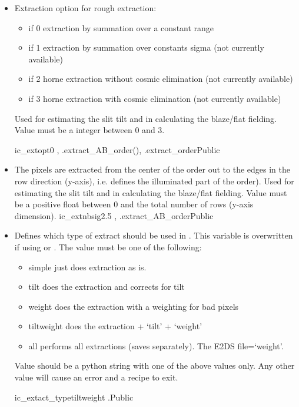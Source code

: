 \begin{itemize}

\item {}
{Extraction option for rough extraction:
\begin{itemize}
\item if 0 extraction by summation over a constant range
\item if 1 extraction by summation over constants sigma (not currently available)
\item if 2 horne extraction without cosmic elimination (not currently available)
\item if 3 horne extraction with cosmic elimination (not currently available)
\end{itemize}
 Used for estimating the slit tilt and in calculating the blaze/flat fielding. Value must be a integer between 0 and 3.
}
{ic\_extopt}{0}
{\calSLIT, \calFFraw}{\constantsfile}
{\spirouEXTOR.extract\_AB\_order(), \spirouEXTOR.extract\_order}{Public}

\item {}
{The pixels are extracted from the center of the order out to the edges in the row direction (y-axis), i.e. defines the illuminated part of the order). Used for estimating the slit tilt and in calculating the blaze/flat fielding. Value must be a positive float between 0 and the total number of rows (y-axis dimension).}
{ic\_extnbsig}{2.5}
{\calSLIT, \calFFraw}{\constantsfile}{\spirouEXTOR.extract\_AB\_order}{Public}


\item {}
{Defines which type of extract should be used in \calextractRAW. This variable is overwritten if using \calextractRAWAB or \calextractRAWC. The value must be one of the following:
\begin{itemize}
\item simple \dotfill just does extraction as is.
\item tilt \dotfill does the extraction and corrects for tilt
\item weight \dotfill does the extraction with a weighting for bad pixels
\item tiltweight \dotfill does the extraction + `tilt' + `weight'
\item all \dotfill performs all extractions (saves separately). The E2DS file=`weight'.
\end{itemize}
Value should be a python string with one of the above values only. Any other value will cause an error and a recipe to exit.
}
{ic\_extact\_type}{tiltweight}
{\calextractRAW}{\constantsfile}{\calextractRAW.\progMAIN}{Public}


\end{itemize}
